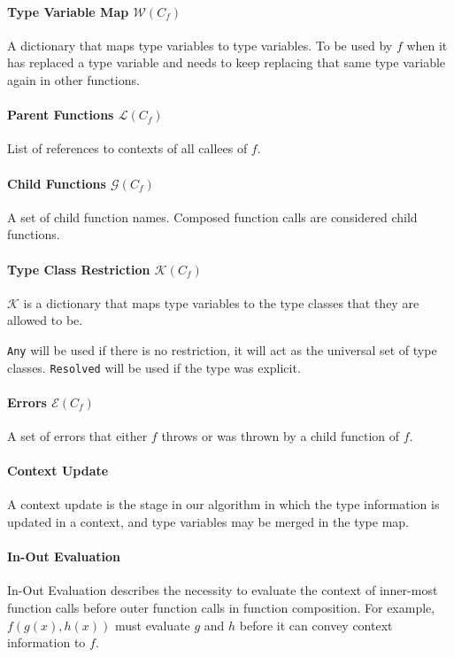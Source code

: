 \documentclass[10pt]{article}
\begin{document}
	\paragraph{Type Variable Map $\mathcal{W}(C_f)$}
	A dictionary that maps type variables to type variables. To be used by $f$
	when it has replaced a type variable and needs to keep replacing that same
	type variable again in other functions.

	\paragraph{Parent Functions $\mathcal{L}(C_f)$}
	List of references to contexts of all callees of $f$.

	\paragraph{Child Functions $\mathcal{G}(C_f)$}
	A set of child function names. Composed function calls are considered child
	functions.


	\paragraph{Type Class Restriction $\mathcal{K}(C_f)$}

	$\mathcal{K}$ is a dictionary that maps type variables to the type classes
	that they are allowed to be.

	\texttt{Any} will
	be used if there is no restriction, it will act as the universal
	set of type classes. \texttt{Resolved} will be used if the type was
	explicit.

	\paragraph{Errors $\mathcal{E}(C_f)$}
	A set of errors that either $f$ throws or was thrown by a child function of
	$f$.

	\paragraph{Context Update}
	A context update is the stage in our algorithm in which the type
	information is updated in a context, and type variables may be merged in
	the type map.

	\paragraph{In-Out Evaluation} 
	In-Out Evaluation describes the necessity to
	evaluate the context of inner-most function calls before outer function
	calls in function composition. For example, $f(g(x),h(x))$ must evaluate
	$g$ and $h$ before it can convey context information to $f$.
\end{document}
